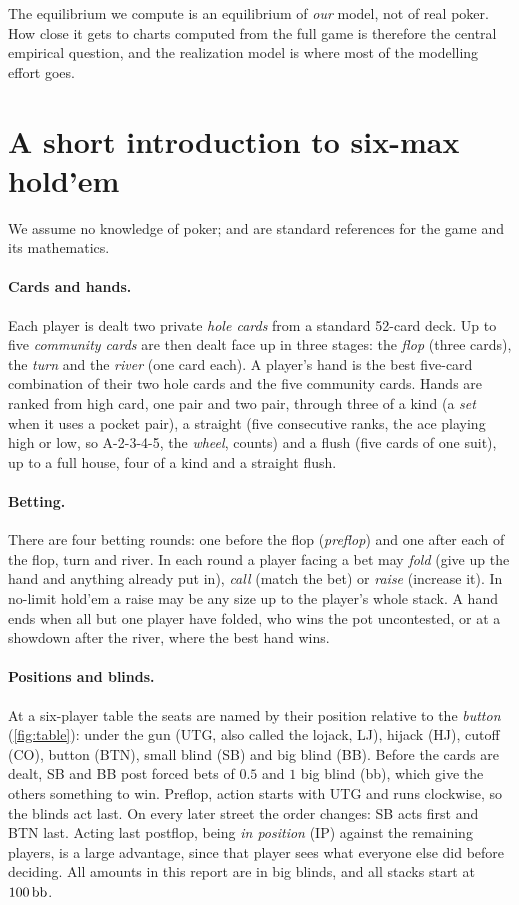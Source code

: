 The equilibrium we compute is an equilibrium of \emph{our} model, not of real poker. How close it gets to charts computed from the full game is therefore the central empirical question, and the realization model is where most of the modelling effort goes.

\section{A short introduction to six-max hold'em}\label{sec:intro-poker}

We assume no knowledge of poker; \textcite{sklansky1999} and \textcite{chen2006} are standard references for the game and its mathematics.

\paragraph{Cards and hands.} Each player is dealt two private \emph{hole cards} from a standard 52-card deck. Up to five \emph{community cards} are then dealt face up in three stages: the \emph{flop} (three cards), the \emph{turn} and the \emph{river} (one card each). A player's hand is the best five-card combination of their two hole cards and the five community cards. Hands are ranked from high card, one pair and two pair, through three of a kind (a \emph{set} when it uses a pocket pair), a straight (five consecutive ranks, the ace playing high or low, so A-2-3-4-5, the \emph{wheel}, counts) and a flush (five cards of one suit), up to a full house, four of a kind and a straight flush.

\paragraph{Betting.} There are four betting rounds: one before the flop (\emph{preflop}) and one after each of the flop, turn and river. In each round a player facing a bet may \emph{fold} (give up the hand and anything already put in), \emph{call} (match the bet) or \emph{raise} (increase it). In no-limit hold'em a raise may be any size up to the player's whole stack. A hand ends when all but one player have folded, who wins the pot uncontested, or at a showdown after the river, where the best hand wins.

\paragraph{Positions and blinds.} At a six-player table the seats are named by their position relative to the \emph{button} (\cref{fig:table}): under the gun (UTG, also called the lojack, LJ), hijack (HJ), cutoff (CO), button (BTN), small blind (SB) and big blind (BB). Before the cards are dealt, SB and BB post forced bets of $0.5$ and $1$ big blind (bb), which give the others something to win. Preflop, action starts with UTG and runs clockwise, so the blinds act last. On every later street the order changes: SB acts first and BTN last. Acting last postflop, being \emph{in position} (IP) against the remaining players, is a large advantage, since that player sees what everyone else did before deciding. All amounts in this report are in big blinds, and all stacks start at $100\,\mathrm{bb}$.

